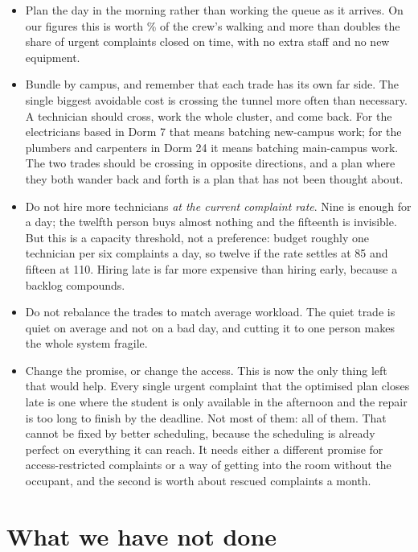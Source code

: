 \documentclass[11pt]{article}
\newcommand{\num}[1]{#1}
\begin{document}
\begin{itemize}
\item Plan the day in the morning rather than working the queue as it
  arrives. On our figures this is worth \NTravelCutPct\% of the crew's
  walking and more than doubles the share of urgent complaints closed on
  time, with no extra staff and no new equipment.
\item Bundle by campus, and remember that each trade has its own far side.
  The single biggest avoidable cost is crossing the tunnel more often than
  necessary. A technician should cross, work the whole cluster, and come
  back. For the electricians based in Dorm 7 that means batching new-campus
  work; for the plumbers and carpenters in Dorm 24 it means batching
  main-campus work. The two trades should be crossing in opposite
  directions, and a plan where they both wander back and forth is a plan
  that has not been thought about.
\item Do not hire more technicians \emph{at the current complaint rate}.
  Nine is enough for \NTicketsPerDay{} a day; the twelfth person buys almost
  nothing and the fifteenth is invisible. But this is a capacity threshold,
  not a preference: budget roughly one technician per six complaints a day,
  so twelve if the rate settles at \num{85} and fifteen at \num{110}.
  Hiring late is far more expensive than hiring early, because a backlog
  compounds.
\item Do not rebalance the trades to match average workload. The quiet trade
  is quiet on average and not on a bad day, and cutting it to one person makes
  the whole system fragile.
\item Change the promise, or change the access. This is now the only thing
  left that would help. Every single urgent complaint that the optimised plan
  closes late is one where the student is only available in the afternoon and
  the repair is too long to finish by the deadline. Not most of them: all of
  them. That cannot be fixed by better scheduling, because the scheduling is
  already perfect on everything it can reach. It needs either a different
  promise for access-restricted complaints or a way of getting into the room
  without the occupant, and the second is worth about
  \NUrgentImpossible{} rescued complaints a month.
\end{itemize}

\section{What we have not done}
\end{document}
